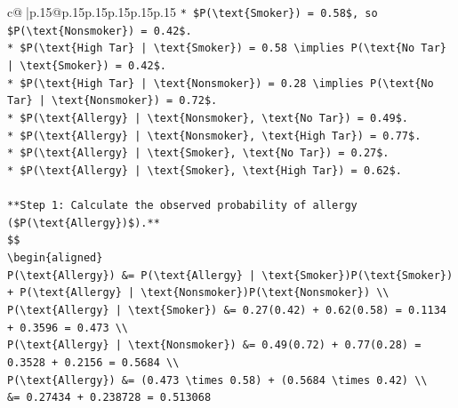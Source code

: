 \documentclass{article}
\begin{document}
{\begin{supertabular}{c@{$\;$}|p{.15\linewidth}@{}p{.15\linewidth}p{.15\linewidth}p{.15\linewidth}p{.15\linewidth}p{.15\linewidth}}
{{{\texttt{*   \$P(\textbackslash{}text\{Smoker\}) = 0.58\$, so \$P(\textbackslash{}text\{Nonsmoker\}) = 0.42\$.} \\
\texttt{*   \$P(\textbackslash{}text\{High Tar\} | \textbackslash{}text\{Smoker\}) = 0.58 \textbackslash{}implies P(\textbackslash{}text\{No Tar\} | \textbackslash{}text\{Smoker\}) = 0.42\$.} \\
\texttt{*   \$P(\textbackslash{}text\{High Tar\} | \textbackslash{}text\{Nonsmoker\}) = 0.28 \textbackslash{}implies P(\textbackslash{}text\{No Tar\} | \textbackslash{}text\{Nonsmoker\}) = 0.72\$.} \\
\texttt{*   \$P(\textbackslash{}text\{Allergy\} | \textbackslash{}text\{Nonsmoker\}, \textbackslash{}text\{No Tar\}) = 0.49\$.} \\
\texttt{*   \$P(\textbackslash{}text\{Allergy\} | \textbackslash{}text\{Nonsmoker\}, \textbackslash{}text\{High Tar\}) = 0.77\$.} \\
\texttt{*   \$P(\textbackslash{}text\{Allergy\} | \textbackslash{}text\{Smoker\}, \textbackslash{}text\{No Tar\}) = 0.27\$.} \\
\texttt{*   \$P(\textbackslash{}text\{Allergy\} | \textbackslash{}text\{Smoker\}, \textbackslash{}text\{High Tar\}) = 0.62\$.} \\
\\ 
\texttt{**Step 1: Calculate the observed probability of allergy (\$P(\textbackslash{}text\{Allergy\})\$).**} \\
\texttt{\$\$} \\
\texttt{\textbackslash{}begin\{aligned\}} \\
\texttt{P(\textbackslash{}text\{Allergy\}) \&= P(\textbackslash{}text\{Allergy\} | \textbackslash{}text\{Smoker\})P(\textbackslash{}text\{Smoker\}) + P(\textbackslash{}text\{Allergy\} | \textbackslash{}text\{Nonsmoker\})P(\textbackslash{}text\{Nonsmoker\}) \textbackslash{}\textbackslash{}} \\
\texttt{P(\textbackslash{}text\{Allergy\} | \textbackslash{}text\{Smoker\}) \&= 0.27(0.42) + 0.62(0.58) = 0.1134 + 0.3596 = 0.473 \textbackslash{}\textbackslash{}} \\
\texttt{P(\textbackslash{}text\{Allergy\} | \textbackslash{}text\{Nonsmoker\}) \&= 0.49(0.72) + 0.77(0.28) = 0.3528 + 0.2156 = 0.5684 \textbackslash{}\textbackslash{}} \\
\texttt{P(\textbackslash{}text\{Allergy\}) \&= (0.473 \textbackslash{}times 0.58) + (0.5684 \textbackslash{}times 0.42) \textbackslash{}\textbackslash{}} \\
\texttt{\&= 0.27434 + 0.238728 = 0.513068} \\
}}}
\end{supertabular}}
\end{document}
